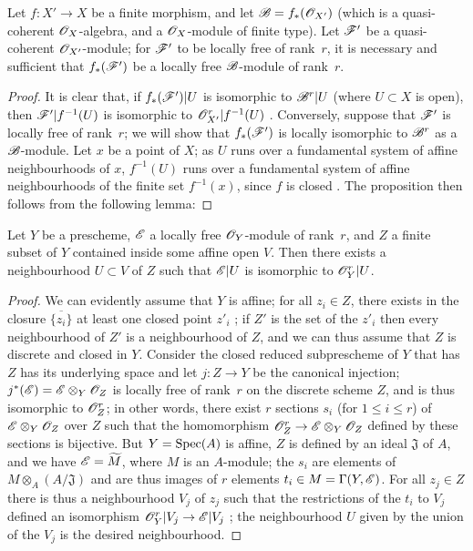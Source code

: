 \begin{proposition}[6.1.12]
\label{II.6.1.12}
Let $f:X'\to X$ be a finite morphism, and let $\mathscr{B}=f_*(\mathscr{O}_{X'})$ (which is a quasi-coherent $\mathscr{O}_X$-algebra, and a $\mathscr{O}_X$-module of finite type).
Let $\mathscr{F}'$ be a quasi-coherent $\mathscr{O}_{X'}$-module;
for $\mathscr{F}'$ to be locally free of rank~$r$, it is necessary and sufficient that $f_*(\mathscr{F}')$ be a locally free $\mathscr{B}$-module of rank~$r$.
\end{proposition}

\begin{proof}
It is clear that, if $f_*(\mathscr{F}')|U$ is isomorphic to $\mathscr{B}^r|U$ (where $U\subset X$ is open), then $\mathscr{F}'|f^{-1}(U)$ is isomorphic to $\mathscr{O}_{X'}^r|f^{-1}(U)$ .
Conversely, suppose that $\mathscr{F}'$ is locally free of rank~$r$; we will show that $f_*(\mathscr{F}')$ is locally isomorphic to $\mathscr{B}^r$ as a $\mathscr{B}$-module.
Let $x$ be a point of $X$;
as $U$ runs over a fundamental system of affine neighbourhoods of $x$, $f^{-1}(U)$ runs over a fundamental system of affine neighbourhoods  of the finite set $f^{-1}(x)$, since $f$ is closed .
The proposition then follows from the following lemma:
\end{proof}

\begin{lemma}[6.1.12.1]
\label{II.6.1.12.1}
Let $Y$ be a prescheme, $\mathscr{E}$ a locally free $\mathscr{O}_Y$-module of rank~$r$, and $Z$ a finite subset of $Y$ contained inside some affine open $V$.
Then there exists a neighbourhood $U\subset V$ of $Z$ such that $\mathscr{E}|U$ is isomorphic to $\mathscr{O}_Y^r|U$.
\end{lemma}

\begin{proof}
We can evidently assume that $Y$ is affine;
for all $z_i\in Z$, there exists in the closure $\overline{\{z_i\}}$ at least one closed point $z'_i$ ;
if $Z'$ is the set of the $z'_i$ then every neighbourhood of $Z'$ is a neighbourhood of $Z$, and we can thus assume that $Z$ is discrete and closed in $Y$.
Consider the closed reduced subprescheme of $Y$ that has $Z$ has its underlying space  and let $j:Z\to Y$ be the canonical injection;
$j^*(\mathscr{E})=\mathscr{E}\otimes_Y\mathscr{O}_Z$ is locally free of rank~$r$ on the discrete scheme $Z$, and is thus isomorphic to $\mathscr{O}_Z^r$;
in other words, there exist $r$ sections $s_i$ (for $1\leq i\leq r$) of $\mathscr{E}\otimes_Y\mathscr{O}_Z$ over $Z$ such that the homomorphism $\sh{O}_Z^r\to\sh{E}\otimes_Y\sh{O}_Z$ defined by these sections is bijective.
But $Y=\operatorname{Spec}(A)$ is affine, $Z$ is defined by an ideal $\mathfrak{J}$ of $A$, and we have $\mathscr{E}=\widetilde{M}$, where $M$ is an $A$-module;
the $s_i$ are elements of $M\otimes_A(A/\mathfrak{J})$ and are thus images of $r$ elements $t_i\in M=\Gamma(Y,\mathscr{E})$.
For all $z_j\in Z$ there is thus a neighbourhood $V_j$ of $z_j$ such that the restrictions of the $t_i$ to $V_j$ defined an isomorphism $\sh{O}_Y^r|V_j\to\sh{E}|V_j$ ;
the neighbourhood $U$ given by the union of the $V_j$ is the desired neighbourhood.
\end{proof}


